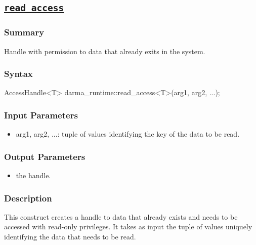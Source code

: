 




\clearpage
\subsection{\underline{\texttt{read\_access}}}

\hspace{0.1cm} %
\begin{subs}
\vspace{-1.2cm}

\subsubsection{Summary} 
Handle with  permission to data that already exits in the system. 

\subsubsection{Syntax} 
\begin{CppCode}
AccessHandle<T> darma_runtime::read_access<T>(arg1, arg2, ...);
\end{CppCode}

\subsubsection{Input Parameters} 
\begin{itemize}
\item arg1, arg2, ...: tuple of values identifying the key of the data to be read.
\end{itemize}

\subsubsection{Output Parameters} 
\begin{itemize}
\item the handle.  
\end{itemize}

\subsubsection{Description} 
This construct creates a handle to data that already exists and 
needs to be accessed with read-only privileges. 
It takes as input the tuple of values uniquely 
identifying the data that needs to be read. 


\end{subs}
